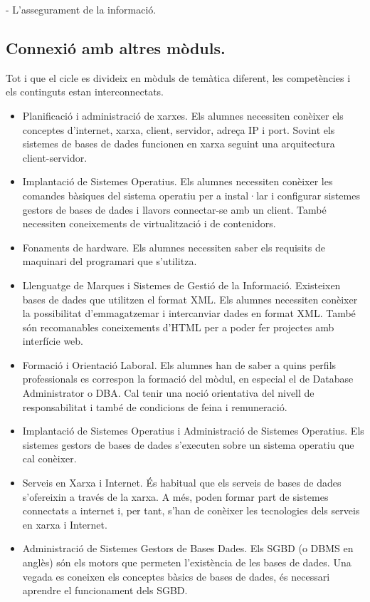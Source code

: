 \documentclass[catalan, a4paper, 12pt, titlepage]{article}
\begin{document}
- L'assegurament de la informació.

\subsection{Connexió amb altres mòduls.}

Tot i que el cicle es divideix en mòduls de temàtica diferent, les competències i els continguts estan interconnectats.

\begin{itemize}
	\item Planificació i administració de xarxes. Els alumnes necessiten conèixer els conceptes d'internet, xarxa, client, servidor, adreça IP i port. Sovint els sistemes de bases de dades funcionen en xarxa seguint una arquitectura client-servidor.
	\item Implantació de Sistemes Operatius. Els alumnes necessiten conèixer les comandes bàsiques del sistema operatiu per a instal·lar i configurar sistemes gestors de bases de dades i llavors connectar-se amb un client. També necessiten coneixements de virtualització i de contenidors.
	\item Fonaments de hardware. Els alumnes necessiten saber els requisits de maquinari del programari que s'utilitza.
	\item Llenguatge de Marques i Sistemes de Gestió de la Informació. Existeixen bases de dades que utilitzen el format XML. Els alumnes necessiten conèixer la possibilitat d'emmagatzemar i intercanviar dades en format XML. També són recomanables coneixements d'HTML per a poder fer projectes amb interfície web.
	\item Formació i Orientació Laboral. Els alumnes han de saber a quins perfils professionals es correspon la formació del mòdul, en especial el de Database Administrator o DBA. Cal tenir una noció orientativa del nivell de responsabilitat i també de condicions de feina i remuneració.
	\item Implantació de Sistemes Operatius i Administració de Sistemes Operatius. Els sistemes gestors de bases de dades s'executen sobre un sistema operatiu que cal conèixer.
	\item Serveis en Xarxa i Internet. És habitual que els serveis de bases de dades s'ofereixin a través de la xarxa. A més, poden formar part de sistemes connectats a internet i, per tant, s'han de conèixer les tecnologies dels serveis en xarxa i Internet.
	\item Administració de Sistemes Gestors de Bases Dades. Els SGBD (o DBMS en anglès) són els motors que permeten l'existència de les bases de dades. Una vegada es coneixen els conceptes bàsics de bases de dades, és necessari aprendre el funcionament dels SGBD.

\end{itemize}
\end{document}
